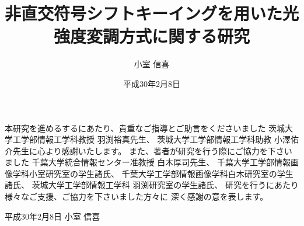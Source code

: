 \documentclass[11pt,oneside]{jreport} %
\title{\textbf{非直交符号シフトキーイングを用いた光強度変調方式に関する研究}} %
\date{平成30年2月8日}           %
\author{小室 信喜}               %
\begin{document}
\maketitle




\tableofcontents

\listoffigures

\listoftables
\newpage
\setcounter{page}{1}%









\acknowledgement
本研究を進めるするにあたり、貴重なご指導とご助言をくださいました
茨城大学工学部情報工学科教授 羽渕裕真先生、
茨城大学工学部情報工学科助教 小澤佑介先生に心より感謝いたします。
また、著者が研究を行う際にご協力を下さいました
千葉大学統合情報センター准教授 白木厚司先生、
千葉大学工学部情報画像学科小室研究室の学生諸氏、
千葉大学工学部情報画像学科白木研究室の学生諸氏、
茨城大学工学部情報工学科 羽渕研究室の学生諸氏、
研究を行うにあたり様々なご支援、ご協力を下さいました方々に
深く感謝の意を表します。
\begin{flushright}
  平成30年2月8日 小室 信喜
\end{flushright}
\end{document}
